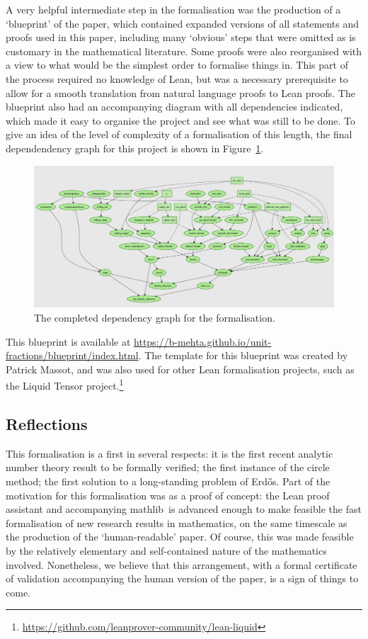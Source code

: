 \documentclass{amsart}
\newcommand{\mathlib}{\textsf{mathlib}}
\begin{document}
A very helpful intermediate step in the formalisation was the production of a `blueprint' of the paper, which contained expanded versions of all statements and proofs used in this paper, including many `obvious' steps that were omitted as is customary in the mathematical literature. Some proofs were also reorganised with a view to what would be the simplest order to formalise things in. This part of the process required no knowledge of Lean, but was a necessary prerequisite to allow for a smooth translation from natural language proofs to Lean proofs. The blueprint also had an accompanying diagram with all dependencies indicated, which made it easy to organise the project and see what was still to be done. To give an idea of the level of complexity of a formalisation of this length, the final dependendency graph for this project is shown in Figure~\ref{fig1}.

\begin{figure}
\includegraphics[scale=0.2]{blueprint}
\caption{The completed dependency graph for the formalisation.}\label{fig1}
\end{figure}

This blueprint is available at \url{https://b-mehta.github.io/unit-fractions/blueprint/index.html}. The template for this blueprint was created by Patrick Massot, and was also used for other Lean formalisation projects, such as the Liquid Tensor project.\footnote{\url{https://github.com/leanprover-community/lean-liquid}}

\subsection{Reflections} This formalisation is a first in several respects: it is the first recent analytic number theory result to be formally verified; the first instance of the circle method; the first solution to a long-standing problem of Erd\H{o}s.  Part of the motivation for this formalisation was as a proof of concept: the Lean proof assistant and accompanying \mathlib\ is advanced enough to make feasible the fast formalisation of new research results in mathematics, on the same timescale as the production of the `human-readable' paper. Of course, this was made feasible by the relatively elementary and self-contained nature of the mathematics involved. Nonetheless, we believe that this arrangement, with a formal certificate of validation accompanying the human version of the paper, is a sign of things to come. 
\end{document}
